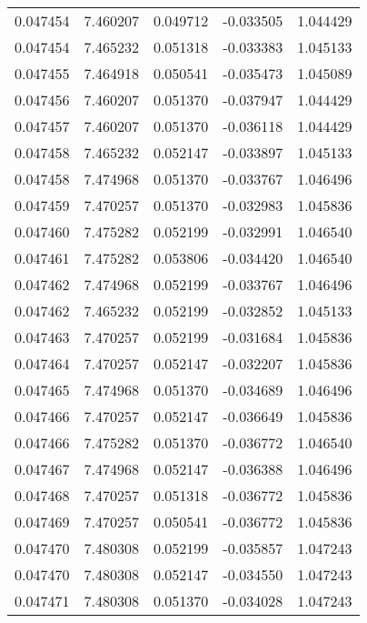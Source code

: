 \begin{tabular}{lrrrr}
0.047454    &  7.460207 &  0.049712 & -0.033505 &             1.044429 \\
0.047454    &  7.465232 &  0.051318 & -0.033383 &             1.045133 \\
0.047455    &  7.464918 &  0.050541 & -0.035473 &             1.045089 \\
0.047456    &  7.460207 &  0.051370 & -0.037947 &             1.044429 \\
0.047457    &  7.460207 &  0.051370 & -0.036118 &             1.044429 \\
0.047458    &  7.465232 &  0.052147 & -0.033897 &             1.045133 \\
0.047458    &  7.474968 &  0.051370 & -0.033767 &             1.046496 \\
0.047459    &  7.470257 &  0.051370 & -0.032983 &             1.045836 \\
0.047460    &  7.475282 &  0.052199 & -0.032991 &             1.046540 \\
0.047461    &  7.475282 &  0.053806 & -0.034420 &             1.046540 \\
0.047462    &  7.474968 &  0.052199 & -0.033767 &             1.046496 \\
0.047462    &  7.465232 &  0.052199 & -0.032852 &             1.045133 \\
0.047463    &  7.470257 &  0.052199 & -0.031684 &             1.045836 \\
0.047464    &  7.470257 &  0.052147 & -0.032207 &             1.045836 \\
0.047465    &  7.474968 &  0.051370 & -0.034689 &             1.046496 \\
0.047466    &  7.470257 &  0.052147 & -0.036649 &             1.045836 \\
0.047466    &  7.475282 &  0.051370 & -0.036772 &             1.046540 \\
0.047467    &  7.474968 &  0.052147 & -0.036388 &             1.046496 \\
0.047468    &  7.470257 &  0.051318 & -0.036772 &             1.045836 \\
0.047469    &  7.470257 &  0.050541 & -0.036772 &             1.045836 \\
0.047470    &  7.480308 &  0.052199 & -0.035857 &             1.047243 \\
0.047470    &  7.480308 &  0.052147 & -0.034550 &             1.047243 \\
0.047471    &  7.480308 &  0.051370 & -0.034028 &             1.047243 \\

\end{tabular}
